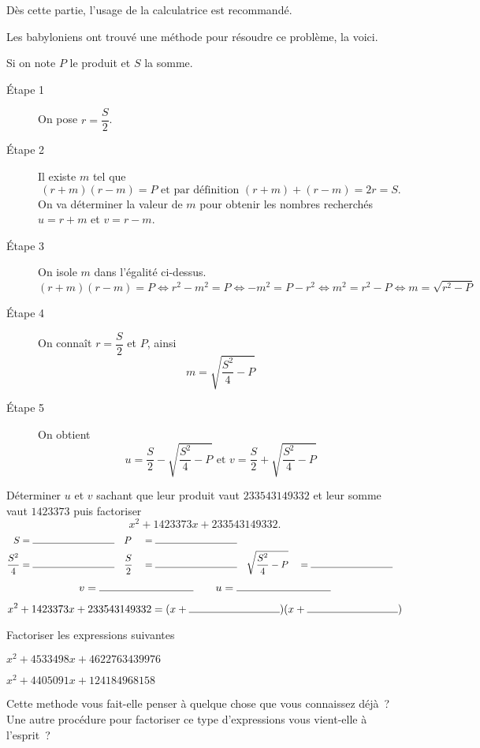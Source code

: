 \documentclass[a4paper,12pt]{report}
\begin{document}
\afterpage{\bpage}
\newpage

\begin{center}
Dès cette partie, l'usage de la calculatrice est recommandé.
\end{center}

Les babyloniens ont trouvé une méthode pour résoudre ce problème, la voici.

Si on note $P$ le produit et $S$ la somme.
\begin{description}
	\item[Étape 1] On pose $r=\dfrac{S}{2}$.
	\item[Étape 2] Il existe $m$ tel que \[(r+m)(r-m)=P \text{ et par définition } (r+m)+(r-m)=2r=S.\] On va déterminer la valeur de $m$ pour obtenir les nombres recherchés $u=r+m$ et $v=r-m$. 
	\item[Étape 3] On isole $m$ dans l'égalité ci-dessus.
		\[(r+m)(r-m)=P \iff r^2-m^2=P \iff -m^2=P-r^2\iff m^2=r^2-P \iff m=\sqrt{r^2-P}\]
	\item[Étape 4] On connaît $r=\dfrac{S}{2}$ et $P$, ainsi
		\[m=\sqrt{\dfrac{S^2}{4}-P}\]
	\item[Étape 5] On obtient 
		\[u=\dfrac{S}{2}-\sqrt{\dfrac{S^2}{4}-P} \text{ et } v=\dfrac{S}{2}+\sqrt{\dfrac{S^2}{4}-P}\]
\end{description}
Déterminer $u$ et $v$ sachant que leur produit vaut $233543149332$ et leur somme vaut $1423373$ puis factoriser \[x^2+1423373x+233543149332.\]
\begin{alignat*}{3}
	S&=\ligne{3}\quad  P&&=\ligne{3} &&\\ 
	\dfrac{S^2}{4}&=\ligne{3}\quad \dfrac{S}{2}&&=\ligne{3}\quad  \sqrt{\dfrac{S^2}{4}-P}&&=\ligne{3}\quad 
\end{alignat*}

	\[v=\ligne{3} \quad \quad u=\ligne{3}\]


	\[x^2+1423373x+233543149332 = (x+\ligne{3})(x+\ligne{3})\]
\begin{exo}
	Factoriser les expressions suivantes
	\begin{tasks}
		\task $x^2+4533498x+4622763439976$

\framebox[0.9\textwidth]{\rule{0pt}{170pt}}
		\task $x^2+4405091x+124184968158$

\framebox[0.9\textwidth]{\rule{0pt}{170pt}}
	\end{tasks}
\end{exo}
Cette methode vous fait-elle penser à quelque chose que vous connaissez déjà~? Une autre procédure pour factoriser ce type d'expressions vous vient-elle à l'esprit~? 
\end{document}
